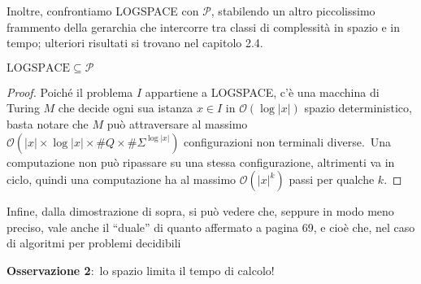 \noindent Inoltre, confrontiamo LOGSPACE con $\mathcal{P}$, stabilendo un altro piccolissimo frammento della gerarchia che intercorre tra classi di complessità in spazio e in tempo; ulteriori risultati si trovano nel capitolo 2.4.

\begin{theorem}
    \label{logspaceInP}
    $\mathrm{LOGSPACE} \subseteq \mathcal{P}$
\end{theorem}

\begin{proof}

    Poiché il problema $I$ appartiene a LOGSPACE, c'è una macchina di Turing $M$ che decide ogni sua istanza $x \in I$ in $\mathcal{O}(\log|x|)$ spazio deterministico, basta notare che $M$ può attraversare al massimo $\mathcal{O}(|x| \times \log|x| \times \#Q \times \#\Sigma^{\log|x|})$ configurazioni non terminali diverse.\
    Una computazione non può ripassare su una stessa configurazione, altrimenti va in ciclo, quindi una computazione ha al massimo $\mathcal{O}\left(|x|^k\right)$ passi per qualche $k$.

\end{proof}

\noindent Infine, dalla dimostrazione di sopra, si può vedere che, seppure in modo meno preciso, vale anche il ``duale'' di quanto affermato a pagina 69, e cioè che, nel caso di algoritmi per problemi decidibili

\begin{center}
    \textbf{Osservazione 2}:\ lo spazio limita il tempo di calcolo!
\end{center}
